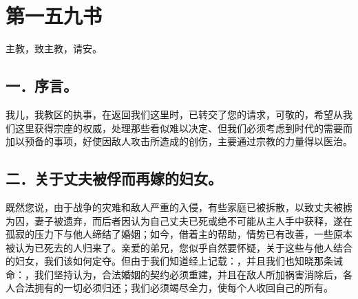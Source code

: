 

\section{第一五九书}

主教，致主教，请安。\par


\subsection{一．序言。}

我儿，我教区的执事，在返回我们这里时，已转交了您的请求，可敬的，希望从我们这里获得宗座的权威，处理那些看似难以决定、但我们必须考虑到时代的需要而加以预备的事项，好使因敌人攻击所造成的创伤，主要通过宗教的力量得以医治。\par


\subsection{二．关于丈夫被俘而再嫁的妇女。}

既然您说，由于战争的灾难和敌人严重的入侵，有些家庭已被拆散，以致丈夫被掳为囚，妻子被遗弃，而后者因认为自己丈夫已死或绝不可能从主人手中获释，遂在孤寂的压力下与他人缔结了婚姻；如今，借着主的帮助，情势已有改善，一些原本被认为已死去的人归来了。亲爱的弟兄，您似乎自然要怀疑，关于这些与他人结合的妇女，我们该如何定夺。但由于我们知道经上记载：，并且我们也知晓那条诫命：，我们坚持认为，合法婚姻的契约必须重建，并且在敌人所加祸害消除后，各人合法拥有的一切必须归还；我们必须竭尽全力，使每个人收回自己的所有。\par


